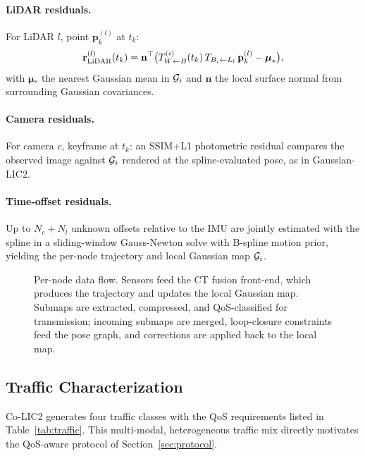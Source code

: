 \paragraph{LiDAR residuals.} For LiDAR $l$, point $\mathbf{p}_k^{(l)}$ at $t_k$:
\begin{equation}
  \mathbf{r}_{\text{LiDAR}}^{(l)}(t_k) =
    \mathbf{n}^\top\bigl(T_{W\leftarrow B}^{(i)}(t_k)\,T_{B_i\leftarrow L_l}\,
    \mathbf{p}_k^{(l)}-\boldsymbol{\mu}_*\bigr),
\end{equation}
with $\boldsymbol{\mu}_*$ the nearest Gaussian mean in $\mathcal{G}_i$ and
$\mathbf{n}$ the local surface normal from surrounding Gaussian covariances.

\paragraph{Camera residuals.} For camera $c$, keyframe at $t_k$: an SSIM+L1
photometric residual compares the observed image against $\mathcal{G}_i$
rendered at the spline-evaluated pose, as in Gaussian-LIC2.

\paragraph{Time-offset residuals.} Up to $N_c+N_l$ unknown offsets relative to
the IMU are jointly estimated with the spline in a sliding-window Gauss-Newton
solve with B-spline motion prior, yielding the per-node trajectory and local
Gaussian map $\mathcal{G}_i$.

\begin{figure}[t]
  \centering
  \resizebox{\columnwidth}{!}{}
  \caption{Per-node data flow. Sensors feed the CT fusion front-end, which
  produces the trajectory and updates the local Gaussian map. Submaps are
  extracted, compressed, and QoS-classified for transmission; incoming
  submaps are merged, loop-closure constraints feed the pose graph, and
  corrections are applied back to the local map.}
  \label{fig:dataflow}
\end{figure}

\subsection{Traffic Characterization}

\label{sec:traffic}

Co-LIC2 generates four traffic classes with the QoS requirements listed in
Table~\ref{tab:traffic}. This multi-modal, heterogeneous traffic mix directly
motivates the QoS-aware protocol of Section~\ref{sec:protocol}.

